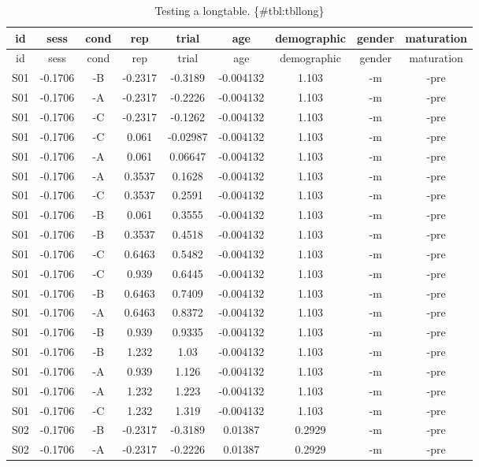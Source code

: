 \documentclass[\pandocDocMode,longtable,noextraspace,floatsintext]{apa6}
\begin{document}
\begin{longtable}[]{@{}ccccccccc@{}}
\caption{Testing a longtable. \{\#tbl:tbllong\}}\tabularnewline
\toprule()
id & sess & cond & rep & trial & age & demographic & gender &
maturation \\
\midrule()
\endfirsthead
\toprule()
id & sess & cond & rep & trial & age & demographic & gender &
maturation \\
\midrule()
\endhead
S01 & -0.1706 & -B & -0.2317 & -0.3189 & -0.004132 & 1.103 & -m &
-pre \\
S01 & -0.1706 & -A & -0.2317 & -0.2226 & -0.004132 & 1.103 & -m &
-pre \\
S01 & -0.1706 & -C & -0.2317 & -0.1262 & -0.004132 & 1.103 & -m &
-pre \\
S01 & -0.1706 & -C & 0.061 & -0.02987 & -0.004132 & 1.103 & -m & -pre \\
S01 & -0.1706 & -A & 0.061 & 0.06647 & -0.004132 & 1.103 & -m & -pre \\
S01 & -0.1706 & -A & 0.3537 & 0.1628 & -0.004132 & 1.103 & -m & -pre \\
S01 & -0.1706 & -C & 0.3537 & 0.2591 & -0.004132 & 1.103 & -m & -pre \\
S01 & -0.1706 & -B & 0.061 & 0.3555 & -0.004132 & 1.103 & -m & -pre \\
S01 & -0.1706 & -B & 0.3537 & 0.4518 & -0.004132 & 1.103 & -m & -pre \\
S01 & -0.1706 & -C & 0.6463 & 0.5482 & -0.004132 & 1.103 & -m & -pre \\
S01 & -0.1706 & -C & 0.939 & 0.6445 & -0.004132 & 1.103 & -m & -pre \\
S01 & -0.1706 & -B & 0.6463 & 0.7409 & -0.004132 & 1.103 & -m & -pre \\
S01 & -0.1706 & -A & 0.6463 & 0.8372 & -0.004132 & 1.103 & -m & -pre \\
S01 & -0.1706 & -B & 0.939 & 0.9335 & -0.004132 & 1.103 & -m & -pre \\
S01 & -0.1706 & -B & 1.232 & 1.03 & -0.004132 & 1.103 & -m & -pre \\
S01 & -0.1706 & -A & 0.939 & 1.126 & -0.004132 & 1.103 & -m & -pre \\
S01 & -0.1706 & -A & 1.232 & 1.223 & -0.004132 & 1.103 & -m & -pre \\
S01 & -0.1706 & -C & 1.232 & 1.319 & -0.004132 & 1.103 & -m & -pre \\
S02 & -0.1706 & -B & -0.2317 & -0.3189 & 0.01387 & 0.2929 & -m & -pre \\
S02 & -0.1706 & -A & -0.2317 & -0.2226 & 0.01387 & 0.2929 & -m & -pre \\

\end{longtable}
\end{document}
